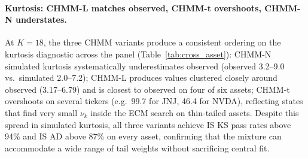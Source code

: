 \paragraph{Kurtosis: CHMM-L matches observed, CHMM-t overshoots, CHMM-N understates.}
At $K = 18$, the three CHMM variants produce a consistent ordering on the kurtosis diagnostic across the panel (Table~\ref{tab:cross_asset}): CHMM-N simulated kurtosis systematically underestimates observed (observed 3.2--9.0 vs.\ simulated 2.0--7.2); CHMM-L produces values clustered closely around observed (3.17--6.79) and is closest to observed on four of six assets; CHMM-t overshoots on several tickers (e.g.\ 99.7 for JNJ, 46.4 for NVDA), reflecting states that find very small $\nu_k$ inside the ECM search on thin-tailed assets.
Despite this spread in simulated kurtosis, all three variants achieve IS KS pass rates above 94\% and IS AD above 87\% on every asset, confirming that the mixture can accommodate a wide range of tail weights without sacrificing central fit.

